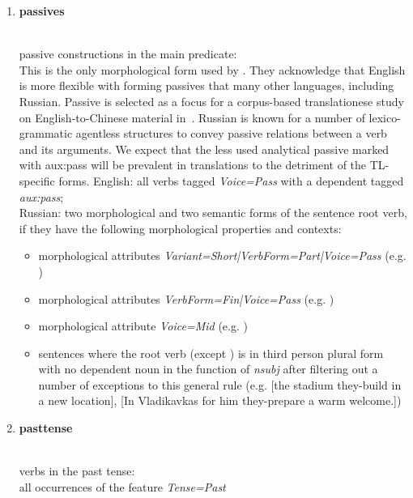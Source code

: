\begin{enumerate}
	\item \hypertarget{ft:passives}{\textbf{passives}} \\
		passive constructions in the main predicate: \\
		This is the only morphological form used by \citet{Volansky2011}. They acknowledge that English is more flexible with forming passives that many other languages, including Russian. Passive is selected as a focus for a corpus-based translationese study on English-to-Chinese material in~\cite{Dai2011}.
		Russian is known for a number of lexico-grammatic agentless structures to convey passive relations between a verb and its arguments. We expect that the less used analytical passive marked with \hypertarget{ft:aux:pass}{aux:pass} will be prevalent in translations to the detriment of the TL-specific forms.    
		English: all verbs tagged \textit{Voice=Pass} with a dependent tagged \textit{aux:pass}; \\
		Russian: two morphological and two semantic forms of the sentence root verb, if they have the following morphological properties and contexts:
		\begin{itemize}\compresslist{}
			\item morphological attributes \textit{Variant=Short|VerbForm=Part|Voice=Pass} (e.g. )
			\item morphological attributes \textit{VerbForm=Fin|Voice=Pass} (e.g. )
			\item morphological attribute \textit{Voice=Mid} (e.g. )
			\item sentences where the root verb (except ) is in third person plural form with no dependent noun in the function of \textit{nsubj} after filtering out a number of exceptions to this general rule (e.g.  [the stadium they-build in a new location],  [In Vladikavkas for him they-prepare a warm welcome.])
		\end{itemize}
	
	\item \hypertarget{ft:pasttense}{\textbf{pasttense}} \\
		verbs in the past tense: \\
		all occurrences of the feature \textit{Tense=Past}
		

\end{enumerate}
